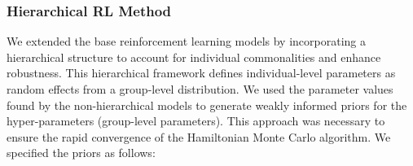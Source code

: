 \documentclass[
  number,
  preprint,
  3p,
  onecolumn]{elsarticle}
\begin{document}
\hypertarget{hierarchical-rl-method}{%
\subsubsection{Hierarchical RL Method}\label{hierarchical-rl-method}}

We extended the base reinforcement learning models by incorporating a
hierarchical structure to account for individual commonalities and
enhance robustness. This hierarchical framework defines individual-level
parameters as random effects from a group-level distribution. We used
the parameter values found by the non-hierarchical models to generate
weakly informed priors for the hyper-parameters (group-level
parameters). This approach was necessary to ensure the rapid convergence
of the Hamiltonian Monte Carlo algorithm. We specified the priors as
follows:
\end{document}
